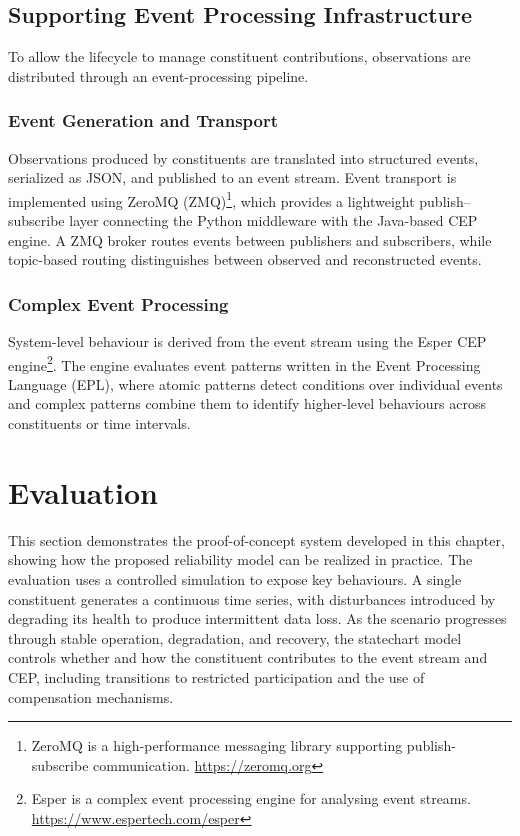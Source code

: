 \subsection{Supporting Event Processing Infrastructure}
To allow the lifecycle to manage constituent contributions, observations are distributed through an event-processing pipeline.

\subsubsection{Event Generation and Transport}
Observations produced by constituents are translated into structured events, serialized as JSON, and published to an event stream. Event transport is implemented using ZeroMQ (ZMQ)\footnote{ZeroMQ is a high-performance messaging library supporting publish-subscribe communication. \url{https://zeromq.org}}, which provides a lightweight publish--subscribe layer connecting the Python middleware with the Java-based CEP engine. A ZMQ broker routes events between publishers and subscribers, while topic-based routing distinguishes between observed and reconstructed events.



\subsubsection{Complex Event Processing}
System-level behaviour is derived from the event stream using the Esper CEP engine\footnote{Esper is a complex event processing engine for analysing event streams. \url{https://www.espertech.com/esper}}. The engine evaluates event patterns written in the Event Processing Language (EPL), where atomic patterns detect conditions over individual events and complex patterns combine them to identify higher-level behaviours across constituents or time intervals.


\section{Evaluation}\label{sec:evaluation}
This section demonstrates the proof-of-concept system developed in this chapter, showing how the proposed reliability model can be realized in practice. The evaluation uses a controlled simulation to expose key behaviours. A single constituent generates a continuous time series, with disturbances introduced by degrading its health to produce intermittent data loss. As the scenario progresses through stable operation, degradation, and recovery, the statechart model controls whether and how the constituent contributes to the event stream and CEP, including transitions to restricted participation and the use of compensation mechanisms.

